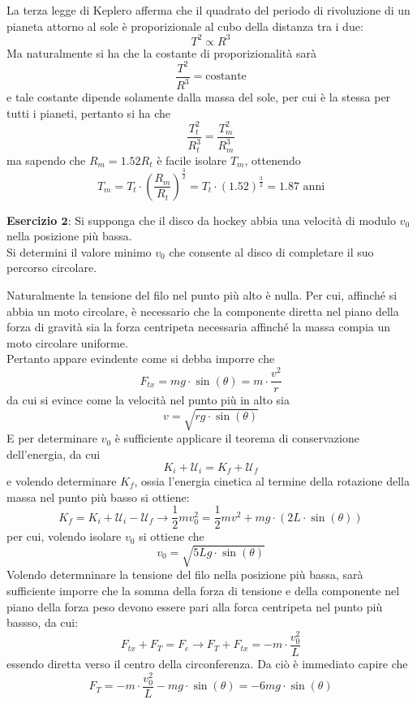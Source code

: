 \documentclass[a4paper]{extarticle}
\begin{document}
\vspace{1em}
\noindent
La terza legge di Keplero afferma che il quadrato del periodo di rivoluzione di un pianeta attorno al sole è proporizionale al cubo della distanza tra i due:
\[T^2 \propto R^3\]
Ma naturalmente si ha che la costante di proporizionalità sarà
\[\frac{T^2}{R^3} = \text{costante}\]
e tale costante dipende solamente dalla massa del sole, per cui è la stessa per tutti i pianeti, pertanto si ha che
\[\frac{T_t^2}{R_t^3} = \frac{T_m^2}{R_m^3}\]
ma sapendo che $R_m=1.52 R_t$ è facile isolare $T_m$, ottenendo
\[T_m = T_t \cdot \left(\frac{R_m}{R_t}\right)^{\frac{3}{2}} = T_t \cdot (1.52)^{\frac{3}{2}}=1.87 \text{ anni}\]

\vspace{1em}
\noindent
\textbf{Esercizio $\boldsymbol{2}$}: Si supponga che il disco da hockey abbia una velocità di modulo $v_0$ nella posizione più bassa.\\
Si determini il valore minimo $v_0$ che consente al disco di completare il suo percorso circolare.

\vspace{1em}
\noindent
Naturalmente la tensione del filo nel punto più alto è nulla. Per cui, affinché si abbia un moto circolare, è necessario che la componente diretta nel piano della forza di gravità sia la forza centripeta necessaria affinché la massa compia un moto circolare uniforme.\\
Pertanto appare evindente come si debba imporre che
\[F_{tx} = mg \cdot \sin(\theta) = m \cdot \frac{v^2}{r}\]
da cui si evince come la velocità nel punto più in alto sia
\[v = \sqrt{rg \cdot \sin(\theta)}\]
E per determinare $v_0$ è sufficiente applicare il teorema di conservazione dell'energia, da cui
\[K_i + \mathcal{U}_i = K_f + \mathcal{U}_f\]
e volendo determinare $K_f$, ossia l'energia cinetica al termine della rotazione della massa nel punto più basso si ottiene:
\[K_f = K_i + \mathcal{U}_i - \mathcal{U}_f \longrightarrow \frac{1}{2} m v_0^2 = \frac{1}{2} m v^2 + mg \cdot (2L \cdot \sin(\theta))\]
per cui, volendo isolare $v_0$ si ottiene che
\[v_0 = \sqrt{5L g \cdot \sin(\theta)}\]
Volendo determninare la tensione del filo nella posizione più bassa, sarà sufficiente imporre che la somma della forza di tensione e della componente nel piano della forza peso devono essere pari alla forca centripeta nel punto più bassso, da cui:
\[F_{tx} + F_T = F_c \longrightarrow F_T + F_{tx} = -m \cdot \frac{v_0^2}{L}\]
essendo diretta verso il centro della circonferenza. Da ciò è immediato capire che
\[F_T = -m \cdot \frac{v_0^2}{L} - mg \cdot \sin(\theta) = -6 mg \cdot \sin(\theta)\]
\end{document}
